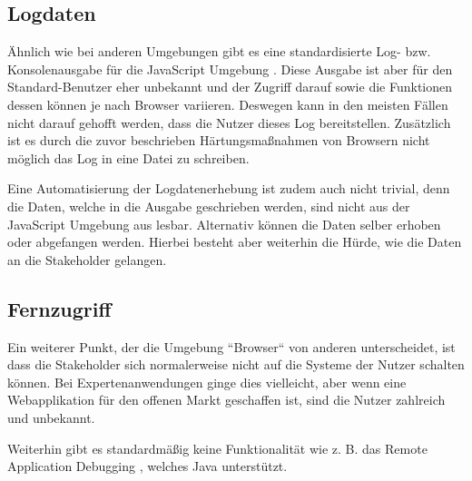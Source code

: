 %
%
%
%

\subsection{Logdaten}

Ähnlich wie bei anderen Umgebungen gibt es eine standardisierte Log- bzw. Konsolenausgabe für die JavaScript Umgebung \cite{MDNConsole}. Diese Ausgabe ist aber für den Standard-Benutzer eher unbekannt und der Zugriff darauf sowie die Funktionen dessen können je nach Browser variieren. Deswegen kann in den meisten Fällen nicht darauf gehofft werden, dass die Nutzer dieses Log bereitstellen. Zusätzlich ist es durch die zuvor beschrieben Härtungsmaßnahmen von Browsern nicht möglich das Log in eine Datei zu schreiben.

Eine Automatisierung der Logdatenerhebung ist zudem auch nicht trivial, denn die Daten, welche in die Ausgabe geschrieben werden, sind nicht aus der JavaScript Umgebung aus lesbar. Alternativ können die Daten selber erhoben oder abgefangen werden. Hierbei besteht aber weiterhin die Hürde, wie die Daten an die Stakeholder gelangen.

\subsection{Fernzugriff}

Ein weiterer Punkt, der die Umgebung ``Browser`` von anderen unterscheidet, ist dass die Stakeholder sich normalerweise nicht auf die Systeme der Nutzer schalten können. Bei Expertenanwendungen ginge dies vielleicht, aber wenn eine Webapplikation für den offenen Markt geschaffen ist, sind die Nutzer zahlreich und unbekannt.

Weiterhin gibt es standardmäßig keine Funktionalität wie z. B. das Remote Application Debugging \cite{JavaDebugWireProtocol}, welches Java unterstützt.